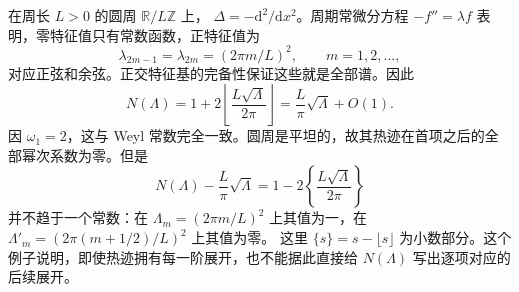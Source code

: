 \begin{example}\label{g3:exm:circle-counting-oscillation}
	在周长 \(L>0\) 的圆周 \(\mathbb R/L\mathbb Z\) 上，
	\(\Delta=-\mathrm d^2/\mathrm dx^2\)。周期常微分方程
	\(-f''=\lambda f\) 表明，零特征值只有常数函数，正特征值为
	\[
		\lambda_{2m-1}=\lambda_{2m}
		=(2\pi m/L)^2,\qquad m=1,2,\ldots,
	\]
	对应正弦和余弦。正交特征基的完备性保证这些就是全部谱。因此
	\[
		N(\Lambda)=1+2\left\lfloor\frac{L\sqrt\Lambda}{2\pi}\right\rfloor
		=\frac L\pi\sqrt\Lambda+O(1).
	\]
	因 \(\omega_1=2\)，这与 Weyl 常数完全一致。圆周是平坦的，故其热迹在首项之后的全部幂次系数为零。但是
	\[
		N(\Lambda)-\frac L\pi\sqrt\Lambda
		=1-2\left\{\frac{L\sqrt\Lambda}{2\pi}\right\}
	\]
	并不趋于一个常数：在
	\(\Lambda_m=(2\pi m/L)^2\) 上其值为一，在
	\(\Lambda'_m=(2\pi(m+1/2)/L)^2\) 上其值为零。
	这里 \(\{s\}=s-\lfloor s\rfloor\) 为小数部分。这个例子说明，即使热迹拥有每一阶展开，也不能据此直接给 \(N(\Lambda)\) 写出逐项对应的后续展开。
\end{example}
